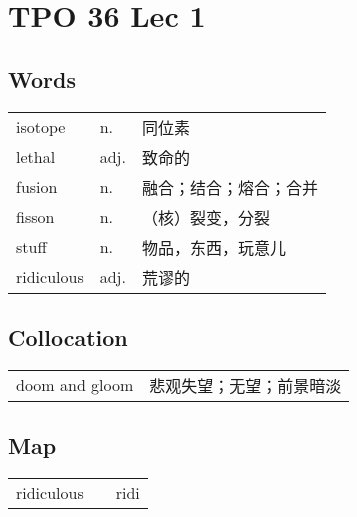 \section{TPO 36 Lec 1}

\subsection{Words}

\begin{tabular}{lll}
    isotope    & n.   & 同位素         \\
    lethal     & adj. & 致命的         \\
    fusion     & n.   & 融合；结合；熔合；合并 \\
    fisson     & n.   & （核）裂变，分裂    \\
    stuff      & n.   & 物品，东西，玩意儿   \\
    ridiculous & adj. & 荒谬的         \\
\end{tabular}

\subsection{Collocation}

\begin{tabular}{ll}
    doom and gloom & 悲观失望；无望；前景暗淡 \\
\end{tabular}

\subsection{Map}

\begin{tabular}{rc@{\quad$\to$\quad}l}
    ridiculous &  & ridi \\
\end{tabular}
